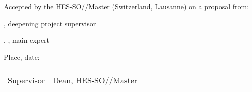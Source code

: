 Accepted by the HES-SO//Master (Switzerland, Lausanne) on a proposal from:

\vspace{0.5cm}

\Supervisor, deepening project supervisor

\Expert, \ExpertLab, main expert

\vspace{1cm}

Place, date: \underline{\hspace{8cm}}

\vspace{3cm}

{ \renewcommand{\arraystretch}{1.5}
\begin{tabularx}{\textwidth}{X X}
	\Supervisor  & \MRU\\ 
	Supervisor   & Dean, HES-SO//Master\\
\end{tabularx}
}